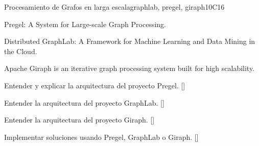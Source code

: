 \begin{syllabus}
\begin{unit}{Procesamiento de Grafos en larga escala}{}{graphlab, pregel, giraph}{10}{C16}
\begin{topics}
    \item Pregel: A System for Large-scale Graph Processing.
    \item Distributed GraphLab: A Framework for Machine Learning and Data Mining in the Cloud.
    \item Apache Giraph is an iterative graph processing system built for high scalability.
\end{topics}
\begin{learningoutcomes}
      \item Entender y explicar la arquitectura del proyecto Pregel. [\Familiarity]
	  \item Entender la arquitectura del proyecto GraphLab. [\Familiarity]
	  \item Entender la arquitectura del proyecto Giraph.  [\Familiarity]
	  \item Implementar soluciones usando Pregel, GraphLab o Giraph. [\Usage]
\end{learningoutcomes}
\end{unit}

\begin{coursebibliography}
\end{coursebibliography}

\end{syllabus}
